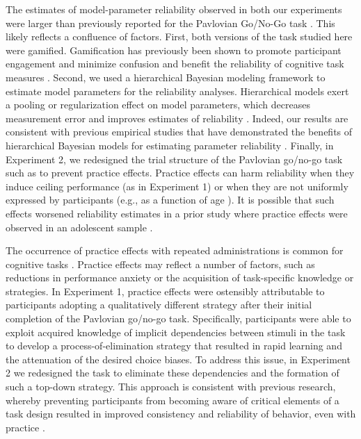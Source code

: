 \documentclass[a4paper,12pt]{article}
\begin{document}
\begin{refsection}[main]
The estimates of model-parameter reliability observed in both our experiments were larger than previously reported for the Pavlovian Go/No-Go task \cite{moutoussis2018change, pike2022test, saeedpour2023interindividual}. This likely reflects a confluence of factors. First, both versions of the task studied here were gamified. Gamification has previously been shown to promote participant engagement and minimize confusion \cite{sailer2017gamification} and benefit the reliability of cognitive task measures \cite{kucina2022solution, verdejo2021unified}. Second, we used a hierarchical Bayesian modeling framework to estimate model parameters for the reliability analyses. Hierarchical models exert a pooling or regularization effect on model parameters, which decreases measurement error and improves estimates of reliability \cite{rouder2019psychometrics, haines2023classical}. Indeed, our results are consistent with previous empirical studies that have demonstrated the benefits of hierarchical Bayesian models for estimating parameter reliability \cite{brown2020improving, waltmann2022sufficient}. Finally, in Experiment 2, we redesigned the trial structure of the Pavlovian go/no-go task such as to prevent practice effects. Practice effects can harm reliability when they induce ceiling performance (as in Experiment 1) or when they are not uniformly expressed by participants (e.g., as a function of age \cite{anokhin2022age}). It is possible that such effects worsened reliability estimates in a prior study where practice effects were observed in an adolescent sample \cite{moutoussis2018change}. 

The occurrence of practice effects with repeated administrations is common for cognitive tasks \cite{hausknecht2007retesting, scharfen2018retest}. Practice effects may reflect a number of factors, such as reductions in performance anxiety or the acquisition of task-specific knowledge or strategies. In Experiment 1, practice effects were ostensibly attributable to participants adopting a qualitatively different strategy after their initial completion of the Pavlovian go/no-go task. Specifically, participants were able to exploit acquired knowledge of implicit dependencies between stimuli in the task to develop a process-of-elimination strategy that resulted in rapid learning and the attenuation of the desired choice biases. To address this issue, in Experiment 2 we redesigned the task to eliminate these dependencies and the formation of such a top-down strategy. This approach is consistent with previous research, whereby preventing participants from becoming aware of critical elements of a task design resulted in improved consistency and reliability of behavior, even with practice \cite{mclean2018towards}. 


\end{refsection}
\end{document}
